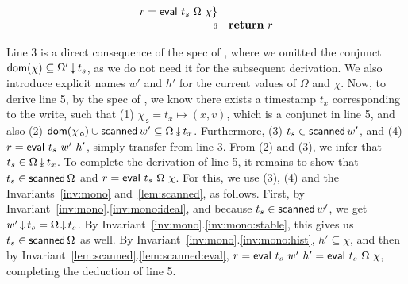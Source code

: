 \documentclass[a4paper,UKenglish]{lipics-v2016}
\newcommand{\dom}[1]{\mathsf{dom}(#1)}
\newcommand{\specK}[1]{\ensuremath{\textcolor{blue}{#1}}}
\newcommand{\kw}[1]{\text{\textbf{#1}}}
\newcommand{\selfsub}{\mathsf{s}}
\newcommand{\othersub}{\mathsf{o}}
\newcommand{\hist}{\chi}
\newcommand{\histS}{\hist_{\, \selfsub}}
\newcommand{\histO}{\hist_{\, \othersub}}
\newcommand{\hpts}{\mapsto}
\newcommand{\ldot}{\mathord{.}\,}
\newcommand{\stableorder}{\Omega}
\newcommand{\stableorderP}{\stableorder'}
\newcommand{\histP}{\chi'}
\newcommand{\histSP}{\hist_{\, \selfsub}'}
\newcommand{\num}[1]{{\text{{\scriptsize{#1}}}}}
\theoremstyle{definition}
\begin{document}
\[\begin{array}{r l}
{%
               r = \eval\ t_s\ \stableorder\ \hist\}}\\
 \num{6} & \kw{return}\ r
\end{array}
\]

Line 3 is a direct consequence of the spec of \jyscan, where we
omitted the conjunct $\dom{\hist} \subseteq
\ideal{\stableorderP}{t_s}$, as we do not need it for the subsequent
derivation. We also introduce explicit names $w'$ and $h'$ for the
current values of $\stableorder$ and $\hist$.
%
Now, to derive line 5, by the spec of \jywrite, we know there exists a
timestamp $t_x$ corresponding to the write, such that (1) $\histS =
t_x \hpts (x, v)$, which is a conjunct in line 5, and also (2)
$\dom{\histO} \cup \scanned{w'} \subseteq
\sideal{\stableorder}{t_x}$. Furthermore, (3) $t_s \in \mathsf{scanned}\,w'$,
and (4) $r = \mathsf{eval}\ t_s\ w'\ h'$, simply transfer from line 3. From
(2) and (3), we infer that $t_s \in \sideal{\stableorder}{t_x}$. To
complete the derivation of line 5, it remains to show that $t_s \in
\scanned{\stableorder}$ and $r = \eval\ t_s\ \stableorder\ \hist$. For
this, we use (3), (4) and the Invariants~\ref{inv:mono}
and~\ref{lem:scanned}, as follows.  First, by
Invariant~\ref{inv:mono}.\ref{inv:mono:ideal}, and because $t_s \in
\mathsf{scanned}\,w'$, we get $\ideal{w'}{t_s} =
\ideal{\stableorder}{t_s}$. By
Invariant~\ref{inv:mono}.\ref{inv:mono:stable}, this gives us $t_s \in
\scanned{\stableorder}$ as well. By
Invariant~\ref{inv:mono}.\ref{inv:mono:hist}, $h' \subseteq \hist$,
and then by Invariant~\ref{lem:scanned}.\ref{lem:scanned:eval}, $r =
\eval\ t_s\ w'\ h' = \eval\ t_s\ \stableorder\ \hist$, completing the
deduction of line 5.
\end{document}
